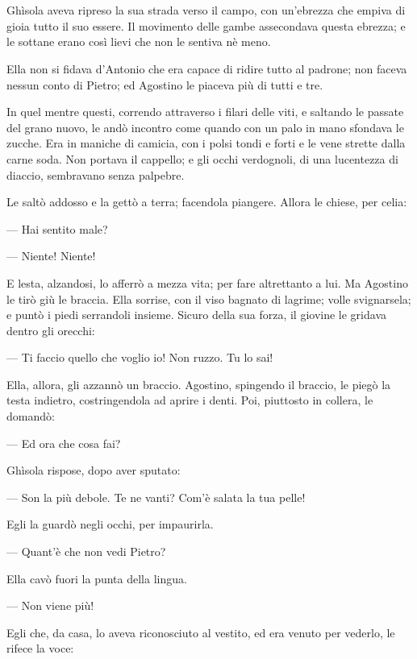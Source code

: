 \chapter{}

Ghìsola aveva ripreso la sua strada verso il campo, con un'ebrezza che empiva di gioia tutto il suo essere. Il movimento delle gambe assecondava questa ebrezza; e le sottane erano così lievi che non le sentiva nè meno.

Ella non si fidava d'Antonio che era capace di ridire tutto al padrone; non faceva nessun conto di Pietro; ed Agostino le piaceva più di tutti e tre.

In quel mentre questi, correndo attraverso i filari delle viti, e saltando le passate del grano nuovo, le andò incontro come quando con un palo in mano sfondava le zucche. Era in maniche di camicia, con i polsi tondi e forti e le vene strette dalla carne soda. Non portava il cappello; e gli occhi verdognoli, di una lucentezza di diaccio, sembravano senza palpebre.

Le saltò addosso e la gettò a terra; facendola piangere. Allora le chiese, per celia:

— Hai sentito male?

— Niente! Niente!

E lesta, alzandosi, lo afferrò a mezza vita; per fare altrettanto a lui. Ma Agostino le tirò giù le braccia. Ella sorrise, con il viso bagnato di lagrime; volle svignarsela; e puntò i piedi serrandoli insieme. Sicuro della sua forza, il giovine le gridava dentro gli orecchi:

— Ti faccio quello che voglio io! Non ruzzo. Tu lo sai!

Ella, allora, gli azzannò un braccio. Agostino, spingendo il braccio, le piegò la testa indietro, costringendola ad aprire i denti. Poi, piuttosto in collera, le domandò:

— Ed ora che cosa fai?

Ghìsola rispose, dopo aver sputato:

— Son la più debole. Te ne vanti? Com’è salata la tua pelle!

Egli la guardò negli occhi, per impaurirla.

— Quant’è che non vedi Pietro?

Ella cavò fuori la punta della lingua.

— Non viene più!

Egli che, da casa, lo aveva riconosciuto al vestito, ed era venuto per vederlo, le rifece la voce:

